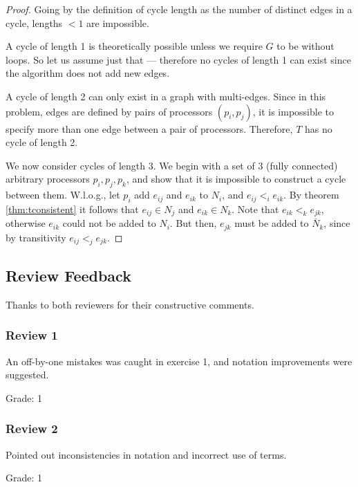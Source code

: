 \begin{proof}
Going by the definition of cycle length as the number of distinct edges in a
cycle, lengths $< 1$ are impossible.

A cycle of length 1 is theoretically possible unless we require $G$ to be
without loops. So let us assume just that --- therefore no cycles of length
1 can exist since the algorithm does not add new edges.

A cycle of length 2 can only exist in a graph with multi-edges. 
Since in this problem, edges are defined by pairs of processors $(p_i, p_j)$,
it is impossible to specify more than one edge between a pair of processors.
Therefore, $T$ has no cycle of length 2.

We now consider cycles of length 3. We begin with a set of 3 (fully connected)
arbitrary processors
$p_i, p_j, p_k$, and show that it is impossible to construct a cycle between them.
W.l.o.g., let $p_i$ add $e_{ij}$ and $e_{ik}$ to $N_i$, and $e_{ij} <_i e_{ik}$.
By theorem \ref{thm:tconsistent} it follows that $e_{ij} \in N_j$ and $e_{ik}
\in N_k$. Note that $e_{ik} <_k e_{jk}$, otherwise $e_{ik}$ could not be added
to $N_i$. But then, $e_{jk}$ must be added to $\overline{N}_k$, since
by transitivity $e_{ij} <_j e_{jk}$.
\end{proof}


\pagebreak
\subsection*{Review Feedback}

Thanks to both reviewers for their constructive comments.

\begin{comment}
The final version of your homework must also include a (single) grade and some
explanatory text for every review you have got, which shall reflect its
appropriateness, utility, ... for improving your work.
\end{comment}

\subsubsection*{Review 1}

An off-by-one mistakes was caught in
exercise 1, and notation improvements were suggested.

Grade: 1

\subsubsection*{Review 2}

Pointed out inconsistencies in notation and incorrect use of terms.

Grade: 1
